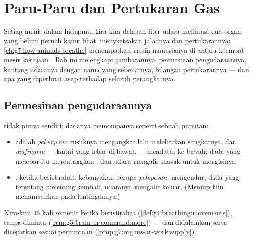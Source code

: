 \chapter{Paru-Paru dan Pertukaran Gas}\label{ch:g7:lungs-and-gas-exchange}

Setiap menit dalam hidupmu, kira-kira delapan liter udara melintasi
dua organ yang belum pernah kamu lihat. 
menyketsakan jalannya dan pertukarannya;
\cref{ch:g7:how-animals-breathe} menempatkan mesin manusianya di
antara keempat mesin kerajaan . Bab ini melengkapi gambarannya:
permesinan pengudaraannya, kantong udaranya dengan nama yang
sebenarnya, bilangan pertukarannya --- dan apa yang diperbuat asap
terhadap seluruh perangkatnya.

\section{Permesinan pengudaraannya}

\begin{proposition}\label{prop:g7:lungs-and-gas-exchange:ventilation}
 tidak punya  sendiri; dadanya memompanya seperti sebuah
puputan:
\begin{itemize}
  \item {} adalah \emph{pekerjaan}:  rusuknya
        mengangkat lalu melebarkan sangkarnya, dan
        \emph{diafragma} --- lantai  yang lebar
        di bawah  --- mendatar ke bawah; dada yang melebar
        itu merentangkan , dan udara mengalir masuk untuk
        mengisinya;
  \item {}, ketika beristirahat, kebanyakan berupa
        \emph{pelepasan}:  mengendur, dada yang terentang
        melenting kembali, udaranya mengalir keluar. (Meniup lilin
        menambahkan  pada lentingannya.)
\end{itemize}
Kira-kira $15$ kali semenit ketika beristirahat
(\cref{def:g4:breathing:movements}), tanpa diminta
(\cref{rem:g5:brain-in-command:more}) --- dan didalamkan serta
dicepatkan sesuai permintaan
(\cref{prop:g7:organs-at-work:supply}).
\end{proposition}
\admitted

